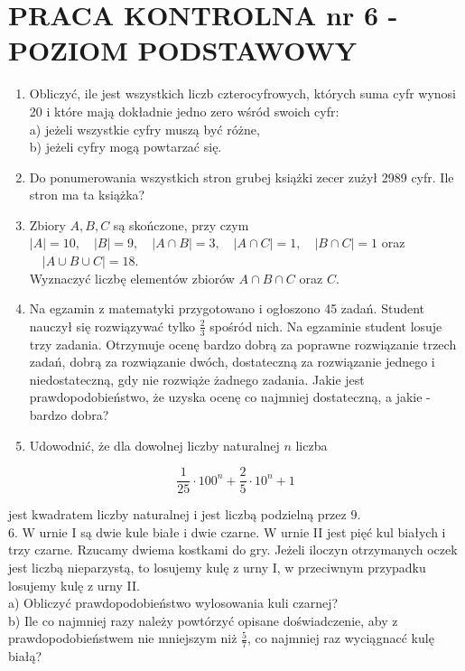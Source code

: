 \documentclass[10pt]{article}
\begin{document}
\section*{PRACA KONTROLNA nr 6 - POZIOM PODSTAWOWY}
\begin{enumerate}
  \item Obliczyć, ile jest wszystkich liczb czterocyfrowych, których suma cyfr wynosi 20 i które mają dokładnie jedno zero wśród swoich cyfr:\\
a) jeżeli wszystkie cyfry muszą być różne,\\
b) jeżeli cyfry mogą powtarzać się.
  \item Do ponumerowania wszystkich stron grubej książki zecer zużył 2989 cyfr. Ile stron ma ta książka?
  \item Zbiory $A, B, C$ są skończone, przy czym\\
$|A|=10, \quad|B|=9, \quad|A \cap B|=3, \quad|A \cap C|=1, \quad|B \cap C|=1$ oraz $\quad|A \cup B \cup C|=18$.\\
Wyznaczyć liczbę elementów zbiorów $A \cap B \cap C$ oraz $C$.
  \item Na egzamin z matematyki przygotowano i ogłoszono 45 zadań. Student nauczył się rozwiązywać tylko $\frac{2}{3}$ spośród nich. Na egzaminie student losuje trzy zadania. Otrzymuje ocenę bardzo dobrą za poprawne rozwiązanie trzech zadań, dobrą za rozwiązanie dwóch, dostateczną za rozwiązanie jednego i niedostateczną, gdy nie rozwiąże żadnego zadania. Jakie jest prawdopodobieństwo, że uzyska ocenę co najmniej dostateczną, a jakie - bardzo dobra?
  \item Udowodnić, że dla dowolnej liczby naturalnej $n$ liczba
\end{enumerate}

$$
\frac{1}{25} \cdot 100^{n}+\frac{2}{5} \cdot 10^{n}+1
$$

jest kwadratem liczby naturalnej i jest liczbą podzielną przez 9.\\
6. W urnie I są dwie kule białe i dwie czarne. W urnie II jest pięć kul białych i trzy czarne. Rzucamy dwiema kostkami do gry. Jeżeli iloczyn otrzymanych oczek jest liczbą nieparzystą, to losujemy kulę z urny I, w przeciwnym przypadku losujemy kulę z urny II.\\
a) Obliczyć prawdopodobieństwo wylosowania kuli czarnej?\\
b) Ile co najmniej razy należy powtórzyć opisane doświadczenie, aby z prawdopodobieństwem nie mniejszym niż $\frac{5}{7}$, co najmniej raz wyciągnacć kulę białą?
\end{document}
